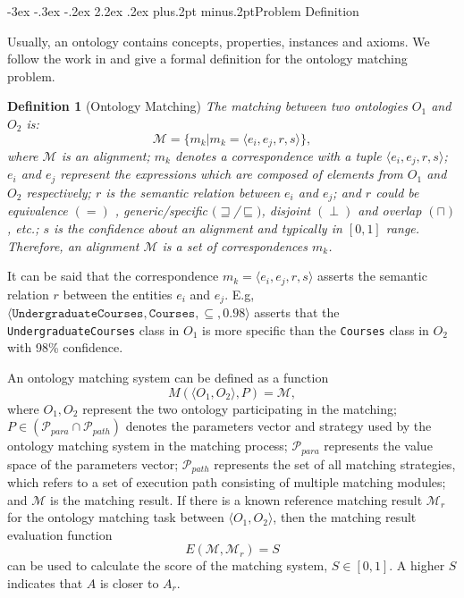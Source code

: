 \documentclass[twoside]{article}
\makeatletter
\def\section{\@startsection{section}{1}{\z@}%
 {-3ex \@plus -.3ex \@minus -.2ex}%
 {2.2ex \@plus.2ex}%
{\normalfont\normalsize\protect\baselineskip=14.5pt plus.2pt minus.2pt\bfseries}}
\makeatother
\begin{document}
\section{Problem Definition}

Usually, an ontology contains concepts, properties, instances and axioms.
We follow the work in \cite{Shvaiko2012, Euzenat2013} and give a formal definition for the ontology matching problem.


{\bf Definition 1} (Ontology Matching)
{\it
The matching between two ontologies $O_{1}$ and $O_{2}$ is:
$$\mathcal {M} =\{m_{k}|m_{k}=\langle e_{i},e_{j},r,s \rangle\},$$
where $\mathcal {M}$ is an alignment;
$m_{k}$ denotes a correspondence with a tuple $\langle e_{i},e_{j},r,s\rangle$;
$e_{i}$ and $e_{j}$ represent the expressions which are composed of elements from $O_{1}$ and $O_{2}$ respectively;
$r$ is the semantic relation between  $e_{i}$ and $e_{j}$;
and $r$ could be equivalence $(=)$ , generic/specific $(\sqsupseteq$/$\sqsubseteq)$, disjoint $(\perp)$ and overlap $(\sqcap)$, etc.;
$s$ is the confidence about an alignment and typically in $[0,1]$ range.
Therefore, an alignment $\mathcal {M}$ is a set of correspondences $m_{k}$.
}

It can be said that the correspondence $ m_{k}\!\!\!\!\!\!\!\!=\langle e_{i},e_{j},r,s\rangle$ asserts the semantic relation $ r $ between the entities $ {e_i} $ and $ {e_j} $.
E.g, $ \langle \texttt {UndergraduateCourses}, \texttt {Courses}, \subseteq , 0.98 \rangle $ asserts that the \texttt {UndergraduateCourses} class in $ {O_ {1}} $ is more specific than the \texttt {Courses} class in $ {O_ {2}} $ with 98\% confidence.

An ontology matching system can be defined as a function
$$ M (\langle O_1, O_2\rangle , P) = \mathcal {M}, $$
where $ O_1, O_2 $ represent the two ontology participating in the matching;
$ P \in (\mathcal{P}_{para} \cap \mathcal {P}_{path}) $ denotes the parameters vector and strategy used by the ontology matching system in the matching process;
$ \mathcal{P}_{para} $ represents the value space of the parameters vector;
$\mathcal{P}_{path}$ represents the set of all matching strategies, which refers to a set of execution path consisting of multiple matching modules;
and $ \mathcal {M} $ is the matching result.
If there is a known reference matching result $ \mathcal {M}_r $ for the ontology matching task between $ \langle O_1, O_2\rangle $,
then the matching result evaluation function
$$ E (\mathcal {M}, \mathcal {M}_r) = S $$
can be used to calculate the score of the matching system, $ S \in [0,1] $. A higher $S$ indicates that $ A $ is closer to $ A_r $.
\end{document}
